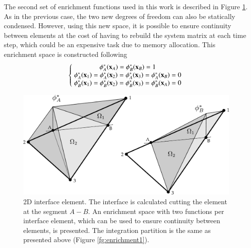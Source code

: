 The second set of enrichment functions used in this work is described in Figure \ref{fg:enrichment2}. As in the previous case, the two new degrees of freedom can also be statically condensed. However, using this new space, it is possible to ensure continuity between elements at the cost of having to rebuild the system matrix at each time step, which could be an expensive task due to memory allocation.
This enrichment space is constructed following
\begin{equation}
   \left\{\;
   \begin{matrix}
     \phi_A^*(\mathbf{x}_A)=\phi_B^*(\mathbf{x}_B)=1 \\
     \phi_A^*(\mathbf{x}_1)=\phi_A^*(\mathbf{x}_2)=\phi_A^*(\mathbf{x}_3)=\phi_A^*(\mathbf{x}_B)=0 \\
     \phi_B^*(\mathbf{x}_1)=\phi_B^*(\mathbf{x}_2)=\phi_B^*(\mathbf{x}_3)=\phi_B^*(\mathbf{x}_A)=0
   \end{matrix}\;
   \right.
   \label{eq:enrich-2a}
\end{equation}

\begin{figure}[H]
  \centering
   \includegraphics[width=.9\columnwidth]{images/enrichment2.pdf}
   \caption{2D interface element. The interface is calculated cutting the element at the segment $A-B$. An enrichment space with two functions per interface element, which can be used to ensure continuity between elements, is presented. The integration partition is the same as presented above (Figure \ref{fg:enrichment1}).}
   \label{fg:enrichment2}
\end{figure}


